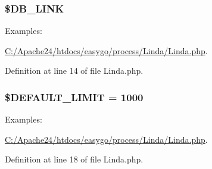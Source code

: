 \hypertarget{class_linda_a11c2781ac527a1c951d9035f2d0197cc}{}
\subsubsection[{\$\+D\+B\+\_\+\+L\+I\+N\+K}]{\setlength{\rightskip}{0pt plus 5cm}\$D\+B\+\_\+\+L\+I\+N\+K\hspace{0.3cm}{\ttfamily [protected]}}\label{class_linda_a11c2781ac527a1c951d9035f2d0197cc}
\begin{Desc}
\item[Examples\+: ]\par
\hyperlink{_c_1_2_apache24_2htdocs_2easygo_2process_2_linda_2_linda_8php-example}{C\+:/\+Apache24/htdocs/easygo/process/\+Linda/\+Linda.\+php}.\end{Desc}


Definition at line 14 of file Linda.\+php.

\hypertarget{class_linda_a97365f1875db5efbdefc5faa71249ff1}{}
\subsubsection[{\$\+D\+E\+F\+A\+U\+L\+T\+\_\+\+L\+I\+M\+I\+T}]{\setlength{\rightskip}{0pt plus 5cm}\$D\+E\+F\+A\+U\+L\+T\+\_\+\+L\+I\+M\+I\+T = 1000\hspace{0.3cm}{\ttfamily [protected]}}\label{class_linda_a97365f1875db5efbdefc5faa71249ff1}
\begin{Desc}
\item[Examples\+: ]\par
\hyperlink{_c_1_2_apache24_2htdocs_2easygo_2process_2_linda_2_linda_8php-example}{C\+:/\+Apache24/htdocs/easygo/process/\+Linda/\+Linda.\+php}.\end{Desc}


Definition at line 18 of file Linda.\+php.

\hypertarget{class_linda_a803cce07cc3e3f9937b6e5faba4100fe}{}

